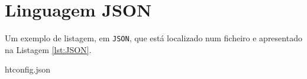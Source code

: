 \chapter{Linguagem JSON}
\label{ch:LangJSON}

Um exemplo de listagem, em \texttt{JSON}, que está localizado num ficheiro e apresentado na Listagem \ref{lst:JSON}.


{htconfig.json}
